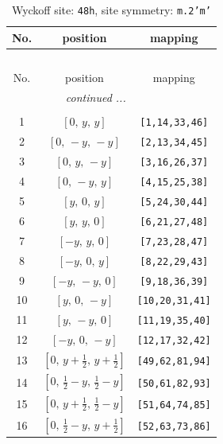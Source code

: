 \documentclass[fleqn,8pt]{jsarticle}
\begin{document}
\begin{longtable}{ccc}
\caption{Wyckoff site: {\tt 48h}, site symmetry: {\tt m.2'm'}}
 \\
 \hline \hline
No. & position & mapping \\ \hline \endfirsthead

\multicolumn{2}{l}{\tablename\ \thetable{}} \\
 \hline \hline
No. & position & mapping \\ \hline \endhead

 \hline \hline
\multicolumn{2}{r}{\footnotesize\it continued ...} \\ \endfoot

 \hline \hline
\multicolumn{2}{r}{} \\ \endlastfoot

1 & $\left[ 0,\, y,\, y \right]$ & {\tt [1,14,33,46]} \\ \hline
2 & $\left[ 0,\, - y,\, - y \right]$ & {\tt [2,13,34,45]} \\ \hline
3 & $\left[ 0,\, y,\, - y \right]$ & {\tt [3,16,26,37]} \\ \hline
4 & $\left[ 0,\, - y,\, y \right]$ & {\tt [4,15,25,38]} \\ \hline
5 & $\left[ y,\, 0,\, y \right]$ & {\tt [5,24,30,44]} \\ \hline
6 & $\left[ y,\, y,\, 0 \right]$ & {\tt [6,21,27,48]} \\ \hline
7 & $\left[ - y,\, y,\, 0 \right]$ & {\tt [7,23,28,47]} \\ \hline
8 & $\left[ - y,\, 0,\, y \right]$ & {\tt [8,22,29,43]} \\ \hline
9 & $\left[ - y,\, - y,\, 0 \right]$ & {\tt [9,18,36,39]} \\ \hline
10 & $\left[ y,\, 0,\, - y \right]$ & {\tt [10,20,31,41]} \\ \hline
11 & $\left[ y,\, - y,\, 0 \right]$ & {\tt [11,19,35,40]} \\ \hline
12 & $\left[ - y,\, 0,\, - y \right]$ & {\tt [12,17,32,42]} \\ \hline
13 & $\left[ 0,\, y + \frac{1}{2},\, y + \frac{1}{2} \right]$ & {\tt [49,62,81,94]} \\ \hline
14 & $\left[ 0,\, \frac{1}{2} - y,\, \frac{1}{2} - y \right]$ & {\tt [50,61,82,93]} \\ \hline
15 & $\left[ 0,\, y + \frac{1}{2},\, \frac{1}{2} - y \right]$ & {\tt [51,64,74,85]} \\ \hline
16 & $\left[ 0,\, \frac{1}{2} - y,\, y + \frac{1}{2} \right]$ & {\tt [52,63,73,86]} \\ \hline

\end{longtable}
\end{document}
